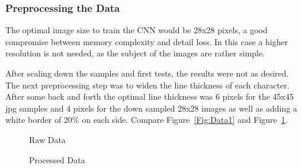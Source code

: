 \documentclass[@CLASSOPTIONS@]{tumarticle}
\begin{document}
\subsubsection{Preprocessing the Data}

The optimal image size to train the CNN would be 28x28 pixels, a good compromise between
memory complexity and detail loss.
In this case a higher resolution is not needed, as the subject of the images are rather simple.

After scaling down the samples and first tests, the results were not as desired.
The next preprocessing step was to widen the line thickness of each character.
After some back and forth the optimal line thickness was 6 pixels for the 45x45 jpg samples and
4 pixels for the down sampled 28x28 images as well as adding a white border of 20\% on each side.
Compare Figure~\ref{Fig:Data1} and Figure~\ref{Fig:Data2}.

\begin{figure}[!htb]
   \begin{minipage}{0.24\textwidth}
     \centering
     \caption{Raw Data}\label{Fig:Data1}
   \end{minipage}\hfill
   \begin{minipage}{0.24\textwidth}
     \centering
     \caption{Processed Data}\label{Fig:Data2}
   \end{minipage}
\end{figure}
\end{document}
